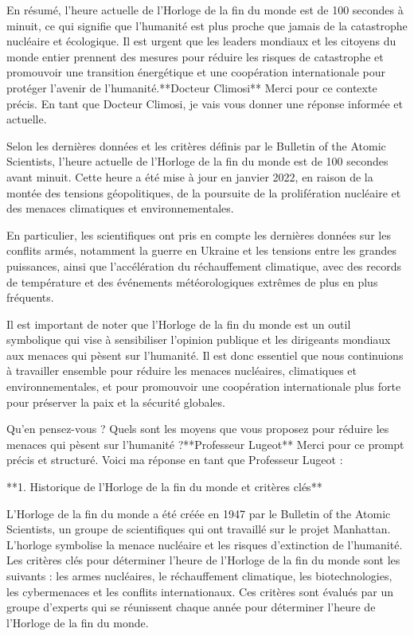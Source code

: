 En résumé, l'heure actuelle de l'Horloge de la fin du monde est de 100 secondes à minuit, ce qui signifie que l'humanité est plus proche que jamais de la catastrophe nucléaire et écologique. Il est urgent que les leaders mondiaux et les citoyens du monde entier prennent des mesures pour réduire les risques de catastrophe et promouvoir une transition énergétique et une coopération internationale pour protéger l'avenir de l'humanité.**Docteur Climosi**
Merci pour ce contexte précis. En tant que Docteur Climosi, je vais vous donner une réponse informée et actuelle. 

Selon les dernières données et les critères définis par le Bulletin of the Atomic Scientists, l'heure actuelle de l'Horloge de la fin du monde est de 100 secondes avant minuit. Cette heure a été mise à jour en janvier 2022, en raison de la montée des tensions géopolitiques, de la poursuite de la prolifération nucléaire et des menaces climatiques et environnementales.

En particulier, les scientifiques ont pris en compte les dernières données sur les conflits armés, notamment la guerre en Ukraine et les tensions entre les grandes puissances, ainsi que l'accélération du réchauffement climatique, avec des records de température et des événements météorologiques extrêmes de plus en plus fréquents.

Il est important de noter que l'Horloge de la fin du monde est un outil symbolique qui vise à sensibiliser l'opinion publique et les dirigeants mondiaux aux menaces qui pèsent sur l'humanité. Il est donc essentiel que nous continuions à travailler ensemble pour réduire les menaces nucléaires, climatiques et environnementales, et pour promouvoir une coopération internationale plus forte pour préserver la paix et la sécurité globales.

Qu'en pensez-vous ? Quels sont les moyens que vous proposez pour réduire les menaces qui pèsent sur l'humanité ?**Professeur Lugeot**
Merci pour ce prompt précis et structuré. Voici ma réponse en tant que Professeur Lugeot :

**1. Historique de l'Horloge de la fin du monde et critères clés**

L'Horloge de la fin du monde a été créée en 1947 par le Bulletin of the Atomic Scientists, un groupe de scientifiques qui ont travaillé sur le projet Manhattan. L'horloge symbolise la menace nucléaire et les risques d'extinction de l'humanité. Les critères clés pour déterminer l'heure de l'Horloge de la fin du monde sont les suivants : les armes nucléaires, le réchauffement climatique, les biotechnologies, les cybermenaces et les conflits internationaux. Ces critères sont évalués par un groupe d'experts qui se réunissent chaque année pour déterminer l'heure de l'Horloge de la fin du monde.

